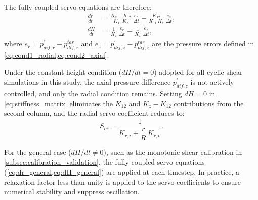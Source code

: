 The fully coupled servo equations are therefore:
\begin{align}
\frac{dr}{dt} &= \frac{K_z-K_{12}}{K_{11}\,K_z}\,\frac{e_r}{\Delta t} - \frac{K_{12}}{K_{11}\,K_z}\,\frac{e_z}{\Delta t}, \label{eq:dr_general}\\[6pt]
\frac{dH}{dt} &= \frac{1}{K_z}\,\frac{e_r}{\Delta t} + \frac{1}{K_z}\,\frac{e_z}{\Delta t}, \label{eq:dH_general}
\end{align}
where $e_r=p_{dif,r}^{\prime}-p_{dif,r}^{tar}$ and $e_z=p_{dif,z}^{\prime}-p_{dif,z}^{tar}$ are the pressure errors defined in \cref{eq:cond1_radial,eq:cond2_axial}.

Under the constant-height condition ($dH/dt=0$) adopted for all cyclic shear simulations in this study, the axial pressure difference $p_{dif,z}^{\prime}$ is not actively controlled, and only the radial condition remains. Setting $dH=0$ in \cref{eq:stiffness_matrix} eliminates the $K_{12}$ and $K_z-K_{12}$ contributions from the second column, and the radial servo coefficient reduces to:
\begin{equation}
S_{cr} = \frac{1}{K_{r,i}+\dfrac{r}{R}\,K_{r,o}}.
\label{eq:Scr_constantH}
\end{equation}

For the general case ($dH/dt\neq 0$), such as the monotonic shear calibration in \cref{subsec:calibration_validation}, the fully coupled servo equations (\cref{eq:dr_general,eq:dH_general}) are applied at each timestep. In practice, a relaxation factor less than unity is applied to the servo coefficients to ensure numerical stability and suppress oscillation.
